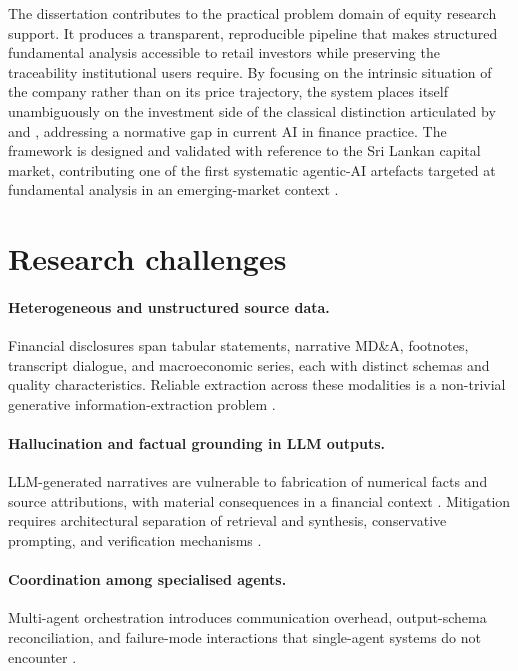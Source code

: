 The dissertation contributes to the practical problem domain of equity research support. It produces a transparent, reproducible pipeline that makes structured fundamental analysis accessible to retail investors while preserving the traceability institutional users require. By focusing on the intrinsic situation of the company rather than on its price trajectory, the system places itself unambiguously on the investment side of the classical distinction articulated by \citet{Graham2006} and \citet{GrahamDodd2008}, addressing a normative gap in current AI in finance practice. The framework is designed and validated with reference to the Sri Lankan capital market, contributing one of the first systematic agentic-AI artefacts targeted at fundamental analysis in an emerging-market context \citep{Bangun2025}.


\section{Research challenges}
\label{sec:challenges}

\paragraph{\textbf{Heterogeneous and unstructured source data.}} Financial disclosures span tabular statements, narrative MD\&A, footnotes, transcript dialogue, and macroeconomic series, each with distinct schemas and quality characteristics. Reliable extraction across these modalities is a non-trivial generative information-extraction problem \citep{Xu2024IE,Provakar2024QA}.

\paragraph{\textbf{Hallucination and factual grounding in LLM outputs.}} LLM-generated narratives are vulnerable to fabrication of numerical facts and source attributions, with material consequences in a financial context \citep{Cernevicene2024,Fatouros2025MarketSense}. Mitigation requires architectural separation of retrieval and synthesis, conservative prompting, and verification mechanisms \citep{Fatouros2025MarketSense,Papasotiriou2024}.

\paragraph{\textbf{Coordination among specialised agents.}} Multi-agent orchestration introduces communication overhead, output-schema reconciliation, and failure-mode interactions that single-agent systems do not encounter \citep{Cheng2025,rezaei2025gwise}.

